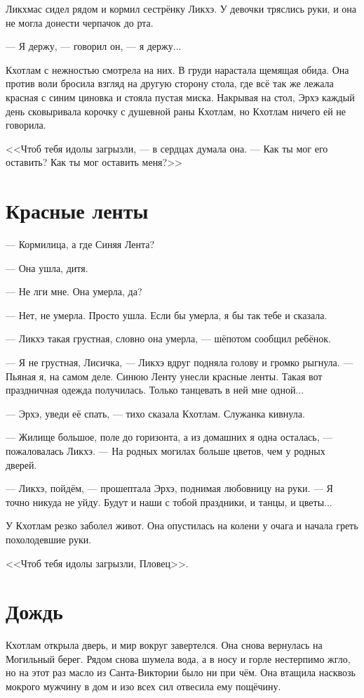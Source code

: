 \documentclass[a4paper,10pt,fleqn]{book}\usepackage{cooltooltips}\usepackage{polyglossia}\setdefaultlanguage{english}\setotherlanguage{russian}\defaultfontfeatures{Ligatures=TeX,Mapping=tex-text} \usepackage{xcolor}\definecolor{lightgray}{HTML}{bbbbbb}\color{lightgray}\newcommand{\ml}[3]{\textcolor{black}{#3}}
\begin{document}
Ликхмас сидел рядом и кормил сестрёнку Ликхэ.
У девочки тряслись руки, и она не могла донести черпачок до рта.

--- Я держу, --- говорил он, --- я держу...

Кхотлам с нежностью смотрела на них.
В груди нарастала щемящая обида.
Она против воли бросила взгляд на другую сторону стола, где всё так же лежала красная с синим циновка и стояла пустая миска.
Накрывая на стол, Эрхэ каждый день сковыривала корочку с душевной раны Кхотлам, но Кхотлам ничего ей не говорила.

<<Чтоб тебя идолы загрызли, --- в сердцах думала она.
--- Как ты мог его оставить?
Как ты мог оставить меня?>>

\section{Красные ленты}

--- Кормилица, а где Синяя Лента?

--- Она ушла, дитя.

--- Не лги мне.
Она умерла, да?

--- Нет, не умерла.
Просто ушла.
Если бы умерла, я бы так тебе и сказала.

--- Ликхэ такая грустная, словно она умерла, --- шёпотом сообщил ребёнок.

--- Я не грустная, Лисичка, --- Ликхэ вдруг подняла голову и громко рыгнула.
--- Пьяная я, на самом деле.
Синюю Ленту унесли красные ленты.
Такая вот праздничная одежда получилась.
Только танцевать в ней мне одной...

--- Эрхэ, уведи её спать, --- тихо сказала Кхотлам.
Служанка кивнула.

--- Жилище большое, поле до горизонта, а из домашних я одна осталась, --- пожаловалась Ликхэ.
--- На родных могилах больше цветов, чем у родных дверей. 

--- Ликхэ, пойдём, --- прошептала Эрхэ, поднимая любовницу на руки.
--- Я точно никуда не уйду.
Будут и наши с тобой праздники, и танцы, и цветы...

У Кхотлам резко заболел живот.
Она опустилась на колени у очага и начала греть похолодевшие руки.

<<Чтоб тебя идолы загрызли, Пловец>>.

\section{Дождь}

Кхотлам открыла дверь, и мир вокруг завертелся.
Она снова вернулась на Могильный берег.
Рядом снова шумела вода, а в носу и горле нестерпимо жгло, но на этот раз масло из Санта-Виктории было ни при чём.
Она втащила насквозь мокрого мужчину в дом и изо всех сил отвесила ему пощёчину.
\end{document}
